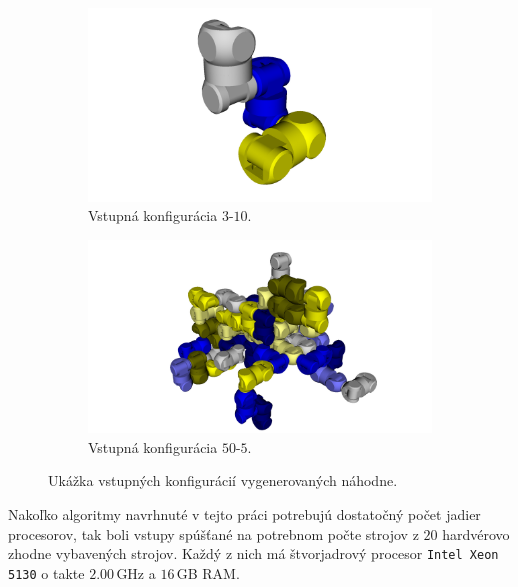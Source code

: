 \documentclass[
  digital, %
  oneside, %
  notable,   %
  lof,     %
  nolot,     %
]{fithesis3}
\begin{document}
\begin{figure}[hbt!]
    \centering
    \begin{subfigure}[b]{0.47\textwidth}
        \includegraphics[width=\textwidth]{pictures/3-10-init.png}
        \caption[3-10-init]{Vstupná konfigurácia $3$-$10$.}
        \label{fig:3-10-init}
    \end{subfigure}
    \begin{subfigure}[b]{0.47\textwidth}
        \includegraphics[width=\textwidth]{pictures/50-5-init.png}
        \caption[50-5-init]{Vstupná konfigurácia $50$-$5$.}
    \end{subfigure}
    \caption[Ukážkové vstupné konfigurácie]{Ukážka vstupných konfigurácií vygenerovaných náhodne. }
    \label{fig:rofibotExamples}
\end{figure}

\newcommand{\comment}[1]{}
\comment{
Okrem náhodne generovaných vstupov boli skúšané aj ručne vytvorené vstupy, kde nie je nutne zaručená existencia rekonfigurácie. Niektoré príklady vizualizuje obrázok \ref{fig:rotationExampleByHand}. }

Nakoľko algoritmy navrhnuté v tejto práci potrebujú dostatočný počet jadier procesorov, tak boli vstupy spúšťané na potrebnom počte strojov z $20$ hardvérovo zhodne vybavených strojov. Každý z nich má štvorjadrový procesor \texttt{Intel Xeon 5130} o takte $2.00$\,GHz a $16$\,GB RAM. 
\end{document}
